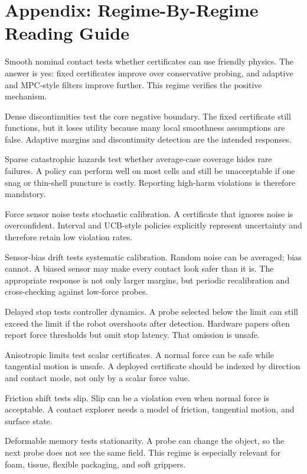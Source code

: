 \documentclass{article}
\begin{document}
\section{Appendix: Regime-By-Regime Reading Guide}

Smooth nominal contact tests whether certificates can use friendly physics.
The answer is yes: fixed certificates improve over conservative probing, and
adaptive and MPC-style filters improve further. This regime verifies the
positive mechanism.

Dense discontinuities test the core negative boundary. The fixed certificate
still functions, but it loses utility because many local smoothness assumptions
are false. Adaptive margins and discontinuity detection are the intended
responses.

Sparse catastrophic hazards test whether average-case coverage hides rare
failures. A policy can perform well on most cells and still be unacceptable if
one snag or thin-shell puncture is costly. Reporting high-harm violations is
therefore mandatory.

Force sensor noise tests stochastic calibration. A certificate that ignores
noise is overconfident. Interval and UCB-style policies explicitly represent
uncertainty and therefore retain low violation rates.

Sensor-bias drift tests systematic calibration. Random noise can be averaged;
bias cannot. A biased sensor may make every contact look safer than it is. The
appropriate response is not only larger margins, but periodic recalibration and
cross-checking against low-force probes.

Delayed stop tests controller dynamics. A probe selected below the limit can
still exceed the limit if the robot overshoots after detection. Hardware papers
often report force thresholds but omit stop latency. That omission is unsafe.

Anisotropic limits test scalar certificates. A normal force can be safe while
tangential motion is unsafe. A deployed certificate should be indexed by
direction and contact mode, not only by a scalar force value.

Friction shift tests slip. Slip can be a violation even when normal force is
acceptable. A contact explorer needs a model of friction, tangential motion,
and surface state.

Deformable memory tests stationarity. A probe can change the object, so the
next probe does not see the same field. This regime is especially relevant for
foam, tissue, flexible packaging, and soft grippers.
\end{document}
